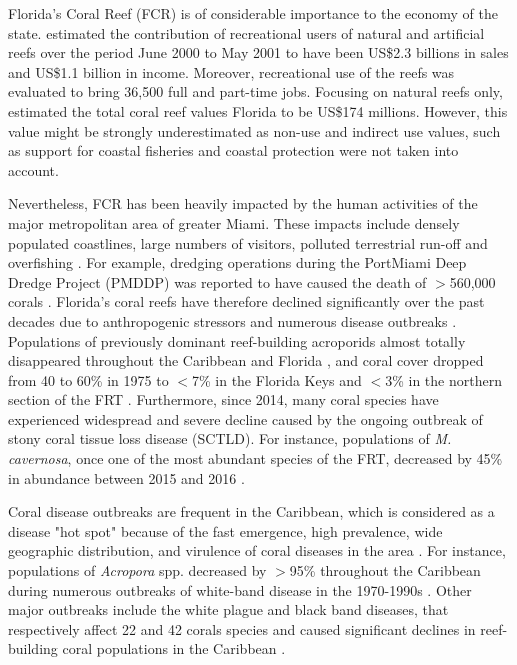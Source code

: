 Florida's Coral Reef (FCR) is of considerable importance to the economy of the state. \cite{johns2003socio} estimated the contribution of recreational users of natural and artificial reefs over the period June 2000 to May 2001 to have been US\$2.3 billions in sales and US\$1.1 billion in income. Moreover, recreational use of the reefs was evaluated to bring 36,500 full and part-time jobs. Focusing on natural reefs only, \cite{brander2013total} estimated the total coral reef values Florida to be US\$174 millions. However, this value might be strongly underestimated as non-use and indirect use values, such as support for coastal fisheries \citep{ault2006building} and coastal protection \citep{ferrario2014effectiveness} were not taken into account.

Nevertheless, FCR has been heavily impacted by the human activities of the major metropolitan area of greater Miami. These impacts include densely populated coastlines, large numbers of visitors, polluted terrestrial run-off and overfishing \citep{jackson2014status}. For example, dredging operations during the PortMiami Deep Dredge Project (PMDDP) was reported to have caused the death of $>$560,000 corals \citep{cunning2019extensive}. Florida's coral reefs have therefore declined significantly over the past decades due to anthropogenic stressors and numerous disease outbreaks \citep{gardner2003long, jackson2014status}. Populations of previously dominant reef-building acroporids almost totally disappeared throughout the Caribbean and Florida \citep{aronson2001white}, and coral cover dropped from 40 to 60\% in 1975 to $<$7\% in the Florida Keys \citep{jackson2014status} and $<$3\% in the northern section of the FRT \citep{walton2018impacts}. Furthermore, since 2014, many coral species have experienced widespread and severe decline caused by the ongoing outbreak of stony coral tissue loss disease (SCTLD). For instance, populations of \textit{M. cavernosa}, once one of the most abundant species of the FRT, decreased by 45\% in abundance between 2015 and 2016 \citep{walton2018impacts}.

Coral disease outbreaks are frequent in the Caribbean, which is considered as a disease "hot spot" because of the fast emergence, high prevalence, wide geographic distribution, and virulence of coral diseases in the area \citep{green2000significance, harvell2007coral}. For instance, populations of  \textit{Acropora} spp. decreased by $>$95\% throughout the Caribbean during numerous outbreaks of white-band disease in the 1970-1990s \citep{aronson2001white}. Other major outbreaks include the white plague and black band diseases, that respectively affect 22 and 42 corals species and caused significant declines in reef-building coral populations in the Caribbean \citep{bruckner2003field,miller2009coral, muller2011black}. 

